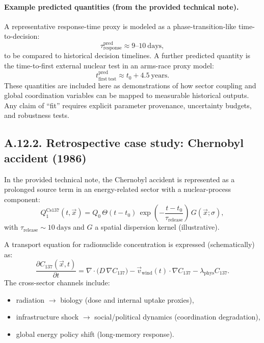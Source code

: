 \documentclass[13pt,a4paper]{article}
\begin{document}
	\paragraph{Example predicted quantities (from the provided technical note).}
	A representative response-time proxy is modeled as a phase-transition-like time-to-decision:
	$$
	\tau_{\mathrm{response}}^{\mathrm{pred}}\approx 9\text{--}10\ \mathrm{days},
	$$
	to be compared to historical decision timelines. A further predicted quantity is the time-to-first external nuclear test in an arms-race proxy model:
	$$
	t_{\mathrm{first\ test}}^{\mathrm{pred}} \approx t_0 + 4.5\ \mathrm{years}.
	$$
	These quantities are included here as demonstrations of how sector coupling and global coordination variables can be mapped to measurable historical outputs. Any claim of ``fit'' requires explicit parameter provenance, uncertainty budgets, and robustness tests.
	
	\subsection*{A.12.2. Retrospective case study: Chernobyl accident (1986)}
	
	In the provided technical note, the Chernobyl accident is represented as a prolonged source term in an energy-related sector with a nuclear-process component:
	$$
	Q_{1}^{\mathrm{Cs137}}(t,\vec{x}) = Q_0\,\Theta(t-t_0)\,\exp\!\left(-\frac{t-t_0}{\tau_{\mathrm{release}}}\right)\,G(\vec{x};\sigma),
	$$
	with $\tau_{\mathrm{release}}\sim 10\ \mathrm{days}$ and $G$ a spatial dispersion kernel (illustrative).
	
	A transport equation for radionuclide concentration is expressed (schematically) as:
	$$
	\frac{\partial C_{137}(\vec{x},t)}{\partial t}
	= \nabla\cdot\big(D\,\nabla C_{137}\big) - \vec{v}_{\mathrm{wind}}(t)\cdot\nabla C_{137} - \lambda_{\mathrm{phys}} C_{137}.
	$$
	The cross-sector channels include:
	\begin{itemize}[leftmargin=*]
		\item radiation $\to$ biology (dose and internal uptake proxies),
		\item infrastructure shock $\to$ social/political dynamics (coordination degradation),
		\item global energy policy shift (long-memory response).
	\end{itemize}
	
\end{document}
